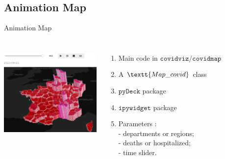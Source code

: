 \documentclass[11pt, compress, tikz, xcolor=table]{beamer}
\theoremstyle{definition}
\begin{document}
\subsection{Animation Map}
\begin{frame}[fragile]{Animation Map}
\begin{columns}
             \centering
             \includegraphics[height=5cm, width=5cm]{images/widget_map.png}
              \textbf{} \begin{enumerate}
                  \item Main code in $\texttt{covidviz/covidmap}$
                  \item A $\textt{Map\_covid}$ class
                  \item $\texttt{pyDeck}$ package
                  \item $\texttt{ipywidget}$ package
                  \item Parameters : \\
                    - departments or regions;\\
                    - deaths or hospitalized;\\
                    - time slider.\\
              \end{enumerate}
         \end{columns} 

\end{frame}
\end{document}

